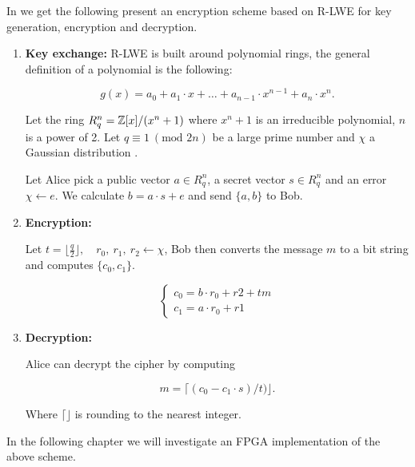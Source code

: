 In \citep{regev09} we get the following present an encryption scheme based on
R-LWE for key generation, encryption and decryption.

\begin{enumerate}
    \item \textbf{Key exchange:}
        R-LWE is built around polynomial rings, the general
        definition of a polynomial is the following:

        \[
            g(x) = a_0 + a_1 \cdot x + \ldots + a_{n-1}
                \cdot x^{n-1} + a_n \cdot x^n.
        \]

        Let the ring $R_q^n = \mathbb{Z}[x]/(x^n + 1)$ where $x^n + 1$ is an
        irreducible polynomial, $n$ is a power of 2. Let $q \equiv 1\
        (\text{mod } 2n)$ be a large prime number and $\chi$ a Gaussian
        distribution \citep{FPGA_Post_Quantum_Primitives}.

        Let Alice pick a public vector $a \in R_q^n$, a secret vector $s \in
        R_q^n$ and an error $\chi \leftarrow e$. We calculate $b = a \cdot s +
        e$ and send $\{a,b\}$ to Bob.

    \item \textbf{Encryption:}

        Let $t = \lfloor \frac{q}{2} \rfloor, \quad r_0,\ r_1,\ r_2
        \leftarrow \chi$, Bob then converts the message $m$ to a bit string and
        computes $\{c_0, c_1\}$.

        \[
            \begin{cases}
                c_0 = b \cdot r_0 + r2 + tm\\
                c_1 = a \cdot r_0 + r1
            \end{cases}
        \]

    \item \textbf{Decryption:}

        Alice can decrypt the cipher by computing

        \[m = \lceil (c_0 - c_1 \cdot s) / t) \rfloor. \]

        Where $\lceil \rfloor$ is rounding to the nearest integer.


\end{enumerate}

In the following chapter we will investigate an FPGA implementation of the
above scheme.
